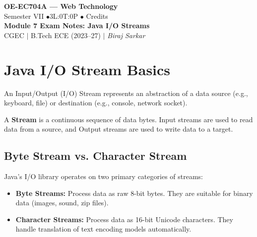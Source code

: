 \documentclass[12pt,a4paper]{article}
\begin{document}

\begin{center}
  {\LARGE\bfseries\color{myred} OE-EC704A --- Web Technology}\\[5pt]
  {\normalsize\color{mydark} Semester VII \quad$\bullet$\quad 3L:0T:0P \quad$\bullet$ Credits}\\[3pt]
  {\normalsize\color{myteal}\textbf{Module 7 Exam Notes: Java I/O Streams}}\\[3pt]
  {\small\color{mydark} CGEC \;$|$\; B.Tech ECE (2023--27) \;$|$\; \textit{Biraj Sarkar}}
\end{center}
\noindent{\color{myred}\rule{\linewidth}{1.5pt}}
\vspace{2pt}

\hypersetup{linkcolor=mydark}
\tableofcontents
\hypersetup{linkcolor=myteal}
\newpage

\section{Java I/O Stream Basics}

An Input/Output (I/O) Stream represents an abstraction of a data source (e.g., keyboard, file) or destination (e.g., console, network socket).

\begin{tcolorbox}[defbox, title={\textbf{Stream Concept}}]
A \textbf{Stream} is a continuous sequence of data bytes. Input streams are used to read data from a source, and Output streams are used to write data to a target.
\end{tcolorbox}

\subsection{Byte Stream vs. Character Stream}
Java's I/O library operates on two primary categories of streams:
\begin{itemize}[leftmargin=*, itemsep=3.5pt]
  \item \textbf{Byte Streams:} Process data as raw 8-bit bytes. They are suitable for binary data (images, sound, zip files).
  \item \textbf{Character Streams:} Process data as 16-bit Unicode characters. They handle translation of text encoding models automatically.
\end{itemize}
\end{document}
